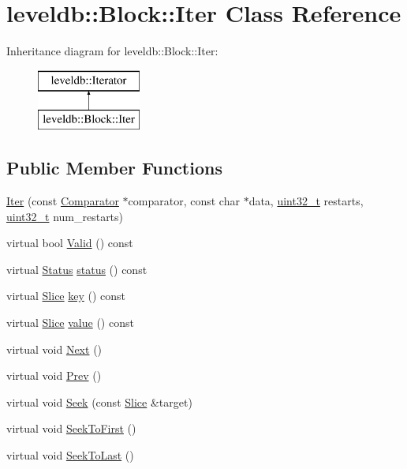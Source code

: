 \hypertarget{classleveldb_1_1_block_1_1_iter}{}\section{leveldb\+:\+:Block\+:\+:Iter Class Reference}
\label{classleveldb_1_1_block_1_1_iter}
Inheritance diagram for leveldb\+:\+:Block\+:\+:Iter\+:\begin{figure}[H]
\begin{center}
\leavevmode
\includegraphics[height=2.000000cm]{classleveldb_1_1_block_1_1_iter}
\end{center}
\end{figure}
\subsection*{Public Member Functions}
\begin{DoxyCompactItemize}
\item 
\hyperlink{classleveldb_1_1_block_1_1_iter_a31b124ec1fc5750b31b182dc44282588}{Iter} (const \hyperlink{structleveldb_1_1_comparator}{Comparator} $\ast$comparator, const char $\ast$data, \hyperlink{stdint_8h_a435d1572bf3f880d55459d9805097f62}{uint32\+\_\+t} restarts, \hyperlink{stdint_8h_a435d1572bf3f880d55459d9805097f62}{uint32\+\_\+t} num\+\_\+restarts)
\item 
virtual bool \hyperlink{classleveldb_1_1_block_1_1_iter_ac4be155bfc93e1d2b90cfd670f22c1ba}{Valid} () const 
\item 
virtual \hyperlink{classleveldb_1_1_status}{Status} \hyperlink{classleveldb_1_1_block_1_1_iter_a39f400b72dc79931145600a702b71c61}{status} () const 
\item 
virtual \hyperlink{classleveldb_1_1_slice}{Slice} \hyperlink{classleveldb_1_1_block_1_1_iter_a1378d5e1fb17638427fd0a0f7fc7a010}{key} () const 
\item 
virtual \hyperlink{classleveldb_1_1_slice}{Slice} \hyperlink{classleveldb_1_1_block_1_1_iter_afb28e69efec54ca9306fc504e139bf3f}{value} () const 
\item 
virtual void \hyperlink{classleveldb_1_1_block_1_1_iter_a27dacbefa903333a5ad003ccd3e424b6}{Next} ()
\item 
virtual void \hyperlink{classleveldb_1_1_block_1_1_iter_a096747ff77d5090579fe4cd4e464a3c9}{Prev} ()
\item 
virtual void \hyperlink{classleveldb_1_1_block_1_1_iter_a3dcefc0609937b33c046ac7fafb52ad7}{Seek} (const \hyperlink{classleveldb_1_1_slice}{Slice} \&target)
\item 
virtual void \hyperlink{classleveldb_1_1_block_1_1_iter_aecc19bb6d8a219e7fb8e695fb5b57bd3}{Seek\+To\+First} ()
\item 
virtual void \hyperlink{classleveldb_1_1_block_1_1_iter_a3007d98d17a03138c629fc2b2eb56204}{Seek\+To\+Last} ()
\end{DoxyCompactItemize}
